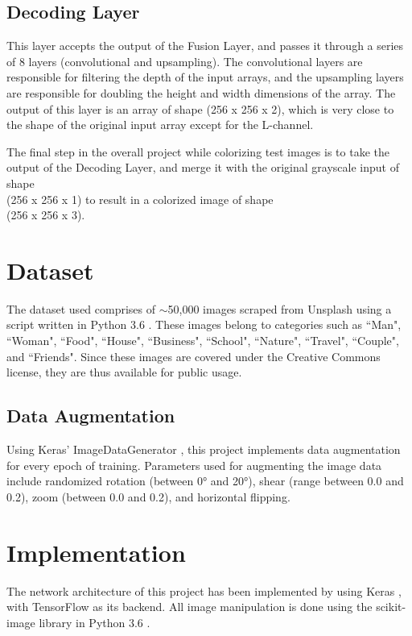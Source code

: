 \documentclass[10pt,twocolumn,letterpaper]{article}
\begin{document}
	\subsection{Decoding Layer}
	This layer accepts the output of the Fusion Layer, and passes it through a series of 8 layers (convolutional and upsampling). The convolutional layers are responsible for filtering the depth of the input arrays, and the upsampling layers are responsible for doubling the height and width dimensions of the array. The output of this layer is an array of shape (256 x 256 x 2), which is very close to the shape of the original input array except for the L-channel.

	The final step in the overall project while colorizing test images is to take the output of the Decoding Layer, and merge it with the original grayscale input of shape\\(256 x 256 x 1) to result in a colorized image of shape\\(256 x 256 x 3).

	\section{Dataset}
	The dataset used comprises of $\sim$50,000 images scraped from Unsplash \cite{Unsplash} using a script written in Python 3.6 \cite{Python}. These images belong to categories such as ``Man", ``Woman", ``Food", ``House", ``Business", ``School", ``Nature", ``Travel", ``Couple", and ``Friends". Since these images are covered under the Creative Commons license, they are thus available for public usage.

	\subsection{Data Augmentation}
	Using Keras' ImageDataGenerator \cite{Keras}, this project implements data augmentation for every epoch of training. Parameters used for augmenting the image data include randomized rotation (between 0° and 20°), shear (range between 0.0 and 0.2), zoom (between 0.0 and 0.2), and horizontal flipping.

	\section{Implementation}
	The network architecture of this project has been implemented by using Keras \cite{Keras}, with TensorFlow \cite{TensorFlow} as its backend. All image manipulation is done using the scikit-image \cite{scikit-image} library in Python 3.6 \cite{Python}.
\end{document}
